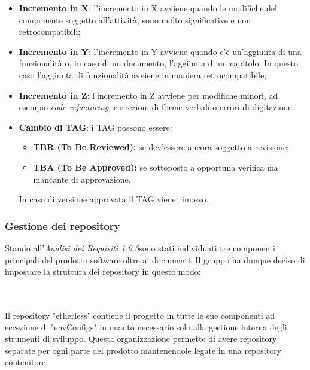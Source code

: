 \begin{itemize}
  \item \textbf{Incremento in X}: l'incremento in X avviene quando le modifiche del componente soggetto all'attività, sono molto significative e non retrocompatibili;
  \item \textbf{Incremento in Y}: l'incremento in Y avviene quando c'è un'aggiunta
  di una funzionalità o, in caso di un documento, l'aggiunta di un capitolo. In questo caso l'aggiunta di funzionalità avviene in maniera retrocompatibile;
  \item \textbf{Incremento in Z}: l'incremento in Z avviene per modifiche minori,
  ad esempio \textit{code refactoring\glos}, correzioni di forme verbali o errori di digitazione.
  \item \textbf{Cambio di TAG}: i TAG possono essere:
  \begin{itemize}
  	\item \textbf{TBR (To Be Reviewed):} se dev'essere ancora soggetto a revisione;
  	\item \textbf{TBA (To Be Approved):} se sottoposto a opportuna verifica ma mancante di approvazione.
  \end{itemize}
  In caso di versione approvata il TAG viene rimosso.
\end{itemize}


\subsubsection{Gestione dei repository}
Stando all'\textit{Analisi dei Requisiti 1.0.0}\doc sono stati individuati
tre componenti principali del prodotto software oltre ai documenti.
Il gruppo ha dunque deciso di impostare la struttura dei repository in questo modo:\\\\

\vspace{1cm}

\noindent \\Il repository "etherless" contiene il progetto in tutte le sue componenti
ad eccezione di "envConfigs" in quanto necessario solo alla gestione interna
degli strumenti di sviluppo. Questa organizzazione permette di avere repository separate per ogni parte
del prodotto mantenendole legate in una repository contenitore.

